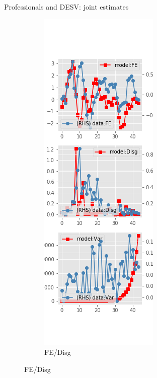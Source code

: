 \documentclass{beamer}
\begin{document}
\begin{frame}{Professionals and DESV: joint estimates}
\begin{figure}[ht]
\begin{subfigure}[b]{0.2\textwidth}
		\end{subfigure}
		\hfill
		\begin{subfigure}[b]{0.2\textwidth}
			\caption{FE/Disg}
			\includegraphics[width=\textwidth, height = 0.8\textheight]{figuresDraft/spf_de_est_sv_joint_diag1.png}

\end{subfigure}
\end{figure}
\end{frame}
\end{document}
